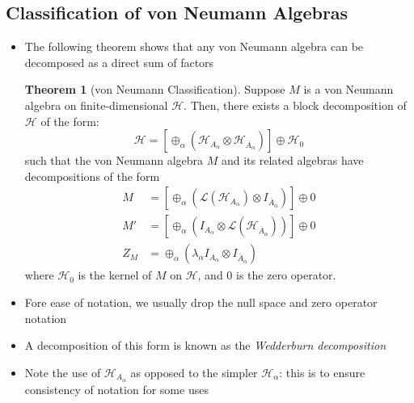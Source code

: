 \documentclass[12pt,a4paper]{article}
\numberwithin{equation}{section}
\theoremstyle{definition}
\theoremstyle{theorem}
\newtheorem{theorem}{Theorem}[section]
\theoremstyle{example}
\begin{document}
	\subsection{Classification of von Neumann Algebras}
	\begin{itemize}
		\item The following theorem shows that any von Neumann algebra can be decomposed as a direct sum of factors 
		\begin{theorem}[von Neumann Classification]
			Suppose $M$ is a von Neumann algebra on finite-dimensional $\mathcal{H}$. Then, there exists a block decomposition of $\mathcal{H}$ of the form:
			\begin{equation}
				\mathcal{H}=\left[\oplus_{\alpha}\left(\mathcal{H}_{A_{\alpha}}\otimes\mathcal{H}_{\overline{A}_{\alpha}}\right)\right]\oplus\mathcal{H}_{0}
			\end{equation}
			such that the von Neumann algebra $M$ and its related algebras have decompositions of the form
			\begin{equation}
				\begin{aligned}
					M&=\left[\oplus_{\alpha}\left(\mathcal{L}(\mathcal{H}_{A_{\alpha}})\otimes I_{\overline{A}_{\alpha}}\right)\right]\oplus 0\\
					M'&=\left[\oplus_{\alpha}\left(I_{A_{\alpha}}\otimes\mathcal{L}(\mathcal{H}_{\overline{A}_{\alpha}})\right)\right]\oplus 0\\
					Z_{M}&=\oplus_{\alpha}\left(\lambda_{\alpha}I_{A_{\alpha}}\otimes I_{\overline{A}_{\alpha}}\right)
				\end{aligned}
			\end{equation}
			where $\mathcal{H}_{0}$ is the kernel of $M$ on $\mathcal{H}$, and $0$ is the zero operator.
		\end{theorem}
		\item Fore ease of notation, we usually drop the null space and zero operator notation
		\item A decomposition of this form is known as the \textit{Wedderburn decomposition}
		\item Note the use of $\mathcal{H}_{A_{\alpha}}$ as opposed to the simpler $\mathcal{H}_{\alpha}$: this is to ensure consistency of notation for some uses
	\end{itemize}
\end{document}
